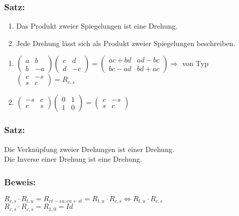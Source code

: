 \subsubsection{Satz:}
\begin{enumerate}
	\item Das Produkt zweier Spiegelungen ist eine Drehung.
	\item Jede Drehung lässt sich als Produkt zweier Spiegelungen beschreiben.
\end{enumerate}
\begin{enumerate}
	\item $ \begin{pmatrix} a & b \\ b & -a \end{pmatrix}  \begin{pmatrix} c & d \\ d & -c \end{pmatrix} = \begin{pmatrix} ac+bd & ad-bc \\ bc-ad & bd+ac \end{pmatrix} \Rightarrow$ von Typ $ \begin{pmatrix} c & -s \\ s & c \end{pmatrix} = R_{c,s}$
	\item $\begin{pmatrix} -s & c \\ c & s \end{pmatrix} \begin{pmatrix} 0 & 1 \\ 1 & 0 \end{pmatrix} = \begin{pmatrix} c  & -s \\ s & c \end{pmatrix}$
\end{enumerate}
%
%
%
\subsubsection{Satz:}
Die Verknüpfung zweier Drehungen ist einer Drehung. \\
Die Inverse einer Drehung ist eine Drehung. 
%
%
%
%
\subsubsection{Beweis:}
$R_{c,s} \cdot R_{t,u}=R_{ct-su,cu+st}=R_{t,u} \cdot R_{c,s} \Leftrightarrow R_{t,u}\cdot R_{c,s}$ \\
$R_{c,s}\cdot R_{c,s} = R_{1,0} = Id$\\
%
%
%
